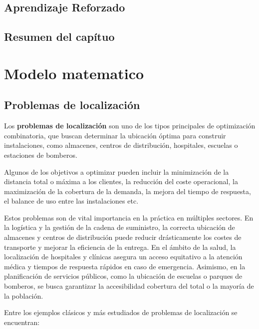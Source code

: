 \documentclass[12pt,a4paper]{book}
\begin{document}
\section{Aprendizaje Reforzado}

\section{Resumen del capítuo}

\chapter{Modelo matematico}

\section{Problemas de localización}

Los \textbf{problemas de localización} son uno de los tipos principales de optimización combinatoria, que buscan determinar la ubicación óptima para construir instalaciones, como almacenes, centros de distribución, hospitales, escuelas o estaciones de bomberos. 

Algunos de los objetivos a optimizar pueden incluir la minimización de la distancia total o máxima a los clientes, la reducción del coste operacional, la maximización de la cobertura de la demanda, la mejora del tiempo de respuesta, el balance de uso entre las instalaciones etc.

Estos problemas son de vital importancia en la práctica en múltiples sectores. En la logística y la gestión de la cadena de suministro, la correcta ubicación de almacenes y centros de distribución puede reducir drásticamente los costes de transporte y mejorar la eficiencia de la entrega. En el ámbito de la salud, la localización de hospitales y clínicas asegura un acceso equitativo a la atención médica y tiempos de respuesta rápidos en caso de emergencia. Asimismo, en la planificación de servicios públicos, como la ubicación de escuelas o parques de bomberos, se busca garantizar la accesibilidad cobertura del total o la mayoría de la población.

Entre los ejemplos clásicos y más estudiados de problemas de localización se encuentran:
\end{document}
